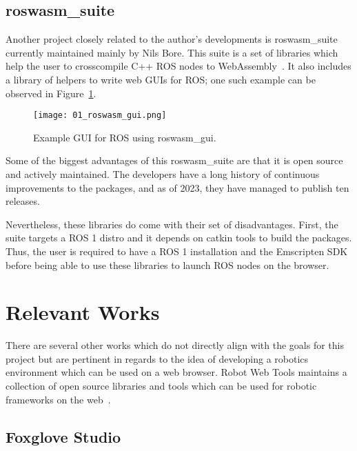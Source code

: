     \subsection{roswasm\_suite}

        Another project closely related to the author's developments is \textsf{roswasm\_suite} currently maintained mainly by Nils Bore. This suite is a set of libraries which help the user to cross\-compile C++ ROS nodes to WebAssembly~\cite{roswasmsuite}. It also includes a library of helpers to write web \ac{GUI}s for ROS; one such example can be observed in Figure~\ref{fig:roswasm_gui}.

        \begin{figure}[htbp]
            \centering
            \texttt{[image: 01\_roswasm\_gui.png]}
            \caption{Example \ac{GUI} for ROS using \textsf{roswasm\_gui}.}
            \label{fig:roswasm_gui}
        \end{figure}

        Some of the biggest advantages of this \textsf{roswasm\_suite} are that it is open source and actively maintained. The developers have a long history of continuous improvements to the packages, and as of 2023, they have managed to publish ten releases. 

        Nevertheless, these libraries do come with their set of disadvantages. First, the suite targets a \ac{ROS} 1 distro and it depends on \textsf{catkin} tools to build the packages. Thus, the user is required to have a \ac{ROS} 1 installation and the Emscripten \ac{SDK} before being able to use these libraries to launch \ac{ROS} nodes on the browser.


\section{Relevant Works}

    There are several other works which do not directly align with the goals for this project but are pertinent in regards to the idea of developing a robotics environment which can be used on a web browser. Robot Web Tools maintains a collection of open source libraries and tools which can be used for robotic frameworks on the web~\cite{robotwebtools}.
    
    \subsection{Foxglove Studio}

